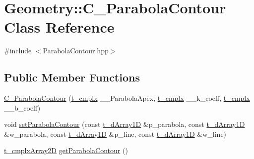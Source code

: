 \hypertarget{class_geometry_1_1_c___parabola_contour}{\section{Geometry\-:\-:C\-\_\-\-Parabola\-Contour Class Reference}
\label{class_geometry_1_1_c___parabola_contour}
}


{\ttfamily \#include $<$Parabola\-Contour.\-hpp$>$}

\subsection*{Public Member Functions}
\begin{DoxyCompactItemize}
\item 
\hyperlink{class_geometry_1_1_c___parabola_contour_aa0c00c9315f7d61dd1731074e0846dba}{C\-\_\-\-Parabola\-Contour} (\hyperlink{types_8h_aa75ae339052372f671bb263e6a272e82}{t\-\_\-cmplx} \-\_\-\-\_\-\-Parabola\-Apex, \hyperlink{types_8h_aa75ae339052372f671bb263e6a272e82}{t\-\_\-cmplx} \-\_\-\-\_\-k\-\_\-coeff, \hyperlink{types_8h_aa75ae339052372f671bb263e6a272e82}{t\-\_\-cmplx} \-\_\-\-\_\-b\-\_\-coeff)
\item 
void \hyperlink{class_geometry_1_1_c___parabola_contour_a578b2b2d45be66ef6effe03cbf047a7a}{set\-Parabola\-Contour} (const \hyperlink{types_8h_a7572e8a35cd6501ce959f177307310a4}{t\-\_\-d\-Array1\-D} \&p\-\_\-parabola, const \hyperlink{types_8h_a7572e8a35cd6501ce959f177307310a4}{t\-\_\-d\-Array1\-D} \&w\-\_\-parabola, const \hyperlink{types_8h_a7572e8a35cd6501ce959f177307310a4}{t\-\_\-d\-Array1\-D} \&p\-\_\-line, const \hyperlink{types_8h_a7572e8a35cd6501ce959f177307310a4}{t\-\_\-d\-Array1\-D} \&w\-\_\-line)
\item 
\hyperlink{types_8h_a4db8c78f1689c3a957b2866daaae58f2}{t\-\_\-cmplx\-Array2\-D} \hyperlink{class_geometry_1_1_c___parabola_contour_a32867584ce7dfc8234a3446fa803c23f}{get\-Parabola\-Contour} ()
\end{DoxyCompactItemize}


